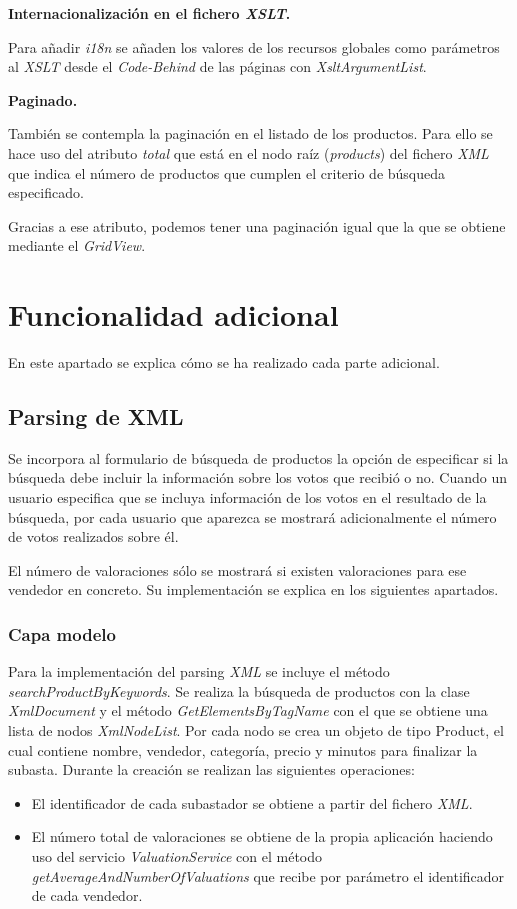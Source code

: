 \documentclass{article}
\begin{document}
\textbf{Internacionalización en el fichero \textit{XSLT}.}

	Para añadir \emph{i18n} se añaden los valores de los recursos globales como parámetros al \emph{XSLT} desde el \emph{Code-Behind} de las páginas con \emph{XsltArgumentList}.
	
\textbf{Paginado.}

	También se contempla la paginación en el listado de los productos. Para ello se hace uso del atributo \emph{total} que está en el nodo raíz (\emph{products}) del fichero \emph{XML} que indica el número de productos que cumplen el criterio de búsqueda especificado.
	
	Gracias a ese atributo, podemos tener una paginación igual que la que se obtiene mediante el \emph{GridView}.

\section{Funcionalidad adicional}
	
	En este apartado se explica cómo se ha realizado cada parte adicional.	
	
\subsection{Parsing de XML}

	Se incorpora al formulario de búsqueda de productos la opción de especificar si la búsqueda debe incluir la información sobre los votos que recibió o no. Cuando un usuario especifica que se incluya información de los votos en el resultado de la búsqueda, por cada usuario que aparezca se mostrará adicionalmente el número de votos realizados sobre él.
	
	El número de valoraciones sólo se mostrará si existen valoraciones para ese vendedor en concreto. Su implementación se explica en los siguientes apartados.
	
\subsubsection{Capa modelo}
	Para la implementación del parsing \emph{XML} se incluye el método \emph{searchProductByKeywords}. Se realiza la búsqueda de productos con la clase \emph{XmlDocument} y el método \emph{GetElementsByTagName} con el que se obtiene una lista de nodos \emph{XmlNodeList}.
	Por cada nodo se crea un objeto de tipo Product, el cual contiene nombre, vendedor, categoría, precio y minutos para finalizar la subasta. Durante la creación se realizan las siguientes operaciones:
\begin{itemize}
	\item El identificador de cada subastador se obtiene a partir del fichero \emph{XML}.
	\item El número total de valoraciones se obtiene de la propia aplicación haciendo uso del servicio \emph{ValuationService} con el método \emph{getAverageAndNumberOfValuations} que recibe por parámetro el identificador de cada vendedor.
\end{itemize}
	
\end{document}
